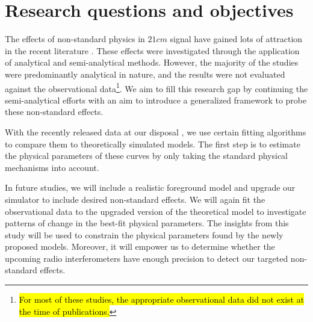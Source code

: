 \documentclass[12pt, TexShade, letterpaper]{report}
\begin{document}
\section{Research questions and objectives}
The effects of non-standard physics in $21cm$ signal have gained lots of attraction in the recent literature \cite{WF_effect_oscar, constrain_dm_21, bh_cosmioc_dawn, cosmic_string_oscar}. These effects were investigated through the application of analytical and semi-analytical methods. However, the majority of the studies were predominantly analytical in nature, and the results were not evaluated against the observational data\footnote{\hl{For most of these studies, the appropriate observational data did not exist at the time of publications.}}. We aim to fill this research gap by continuing the semi-analytical efforts with an aim to introduce a generalized framework to probe these non-standard effects.\par
With the recently released data at our disposal \cite{edges}, we use certain fitting algorithms to compare them to theoretically simulated models\cite{ares2014jordan}. 
The first step is to estimate the physical parameters of these curves by only taking the standard physical mechanisms into account.\par
In future studies, we will include a realistic foreground model and upgrade our simulator to include desired non-standard effects. We will again fit the observational data to the upgraded version of the theoretical model to investigate patterns of change in the best-fit physical parameters. The insights from this study will be used to constrain the physical parameters found by the newly proposed models. Moreover, it will empower us to determine whether the upcoming radio interferometers have enough precision to detect our targeted non-standard effects.\par
\end{document}
